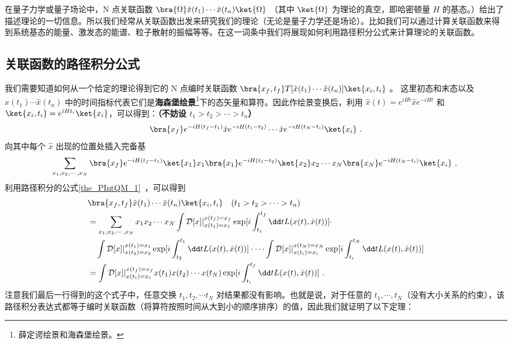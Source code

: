 
在量子力学或量子场论中，N 点关联函数 $\bra{\Omega}\hat x(t_1)\cdots \hat x(t_n)\ket{\Omega}$ （其中 $\ket{\Omega}$ 为理论的真空，即哈密顿量 $H$ 的基态。）给出了描述理论的一切信息。所以我们经常从关联函数出发来研究我们的理论（无论是量子力学还是场论）。比如我们可以通过计算关联函数来得到系统基态的能量、激发态的能谱、粒子散射的振幅等等。在这一词条中我们将展现如何利用路径积分公式来计算理论的关联函数。
\subsection{关联函数的路径积分公式}
我们需要知道如何从一个给定的理论得到它的 N 点编时关联函数
 $\bra{x_f,t_f} T[\hat x(t_1)\cdots \hat x(t_n)]\ket{x_i,t_i}$ 。
这里初态和末态以及 $\hat x(t_1)\cdots \hat x(t_n)$ 中的时间指标代表它们是\textbf{海森堡绘景}\footnote{薛定谔绘景和海森堡绘景。}下的态矢量和算符。因此作绘景变换后，利用 $\hat x(t)=e^{iHt}\hat x e^{-iHt}$ 和 $\ket{x_i,t_i}=e^{iHt_i} \ket{x_i}$，可以得到：\textbf{（不妨设 $t_1>t_2>\cdots >t_n$）}
\begin{equation}
\bra{x_f} e^{-iH (t_f-t_1)} \hat x e^{-iH(t_1-t_2)}\cdots \hat x e^{-iH(t_N-t_i)}\ket{x_i}~.
\end{equation}
向其中每个 $\hat x$ 出现的位置处插入完备基
\begin{equation}
\begin{aligned}
\sum_{x_1,x_2,\cdots,x_N}\bra{x_f} e^{-iH (t_f-t_1)} \ket{x_{1}}x_1\bra{x_1} e^{-iH(t_1-t_2)}\ket{x_2}x_2\cdots x_N \bra{x_N} e^{-iH(t_N-t_i)}\ket{x_i}~,
\end{aligned}~
\end{equation}
利用路径积分的公式\autoref{the_PIntQM_1}~，可以得到
\begin{equation}
\begin{aligned}
&\bra{x_f,t_f} \hat x(t_1)\cdots \hat x(t_n)\ket{x_i,t_i}\quad (t_1>t_2>\cdots >t_n)\\
&=\sum_{x_1,x_2,\cdots,x_N}x_1x_2\cdots x_N
\int \mathcal{D}[x]|_{x(t_1)=x_1}^{x(t_f)=x_f} \exp[i\int_{t_1}^{t_f} \dd t L(x(t),\dot x(t))] \cdot \\
&\quad \int \mathcal{D}[x]|_{x(t_2)=x_2}^{x(t_1)=x_1}
\exp[i\int_{t_2}^{t_1} \dd t L(x(t),\dot x(t))]
\cdot \cdots 
\int \mathcal{D}[x]|_{x(t_i)=x_i}^{x(t_N)=x_N} 
\exp[i\int_{t_i}^{t_N} \dd t L(x(t),\dot x(t))]\\
&=\int \mathcal{D}[x]|_{x(t_i)=x_i}^{x(t_f)=x_f} x(t_1)x(t_2)\cdots x(t_N) \exp[i\int_{t_i}^{t_f} \dd t L(x(t),\dot x(t))]~.
\end{aligned}
\end{equation}
注意我们最后一行得到的这个式子中，任意交换 $t_1,t_2,\cdots t_N$ 对结果都没有影响。也就是说，对于任意的 $t_1,\cdots,t_N$（没有大小关系的约束），该路径积分表达式都等于编时关联函数（将算符按照时间从大到小的顺序排序）的值，因此我们就证明了以下定理：

